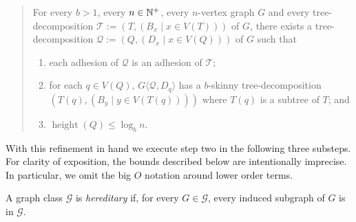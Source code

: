 \documentclass{patmorin}
\renewcommand{\le}{\leqslant}
\newcommand{\defin}[1]{\emph{\textcolor{brightmaroon}{#1}}}
\newcommand{\torso}[2]{{#1}\langle{#2}\rangle}
\DeclareMathOperator{\height}{height}
\newcommand{\calG}{\mathcal{G}}
\newcommand{\calQ}{\mathcal{Q}}
\newcommand{\calT}{\mathcal{T}}
\begin{document}
  \begin{quote}
    For every $b>1$, every $n\in\mathbb{N}^+$, every $n$-vertex graph $G$ and every tree-decomposition $\calT:=(T,(B_x\mid x\in V(T)))$ of $G$, there exists a tree-decomposition $\calQ:=(Q,(D_x\mid x\in V(Q)))$ of $G$ such that
    \begin{enumerate}[nosep,nolistsep,label=\rm(\roman*)]
      \item
      each adhesion of $\calQ$ is an adhesion of $\calT$;
      \item for each $q\in V(Q)$, $\torso{G}{\calQ,D_q}$ has a $b$-skinny tree-decomposition $(T(q), (B_y\mid y\in V(T(q))))$ where $T(q)$ is a subtree of $T$; and
      \item $\height(Q)\le \log_b n$.
    \end{enumerate}
  \end{quote}

With this refinement in hand we execute step two in the following three substeps. For clarity of exposition, the bounds described below are intentionally imprecise. In particular, we omit the big $O$ notation around lower order terms. 

A graph class $\calG$ is \defin{hereditary} if, for every $G\in\calG$, every induced subgraph of $G$ is in $\calG$. 
\end{document}
